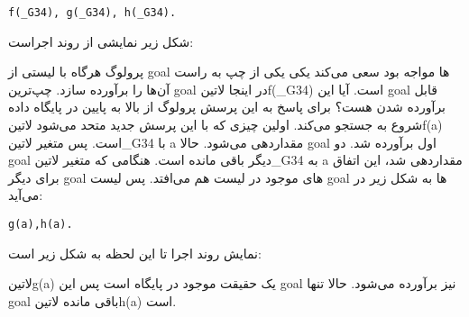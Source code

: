 \begin{latin}
\begin{lstlisting}
f(_G34), g(_G34), h(_G34).
\end{lstlisting}
\end{latin}

شکل زیر نمایشی از روند اجراست:

\begin{latin}
\end{latin}

پرولوگ هرگاه با لیستی از goal ها مواجه بود سعی می‌کند یکی یکی از چپ به راست آن‌ها را برآورده سازد. چپ‌ترین goal در اینجا ‌لاتین{f(\_G34)} است. آیا این goal قابل برآورده شدن هست؟ برای پاسخ به این پرسش پرولوگ از بالا به پایین در پایگاه داده شروع به جستجو می‌کند. اولین چیزی که با این پرسش جدید متحد می‌شود ‌لاتین{f(a)} است. پس متغیر ‌لاتین{\_G34} با a مقداردهی می‌شود. حالا goal اول  برآورده شد. دو goal دیگر باقی مانده است. هنگامی که متغیر ‌لاتین{\_G34} به a مقداردهی شد، این اتفاق برای دیگر goal های موجود در لیست هم می‌افتد. پس لیست goal ها به شکل زیر در می‌آید:

\begin{latin}
\begin{lstlisting}
g(a),h(a).
\end{lstlisting}
\end{latin}

نمایش روند اجرا تا این لحظه به شکل زیر است:
\begin{latin}
\end{latin}

‌لاتین{g(a)} یک حقیقت موجود در پایگاه است پس این goal نیز برآورده می‌شود. حالا تنها goal باقی مانده ‌لاتین{h(a)} است.

\begin{latin}
\end{latin}


